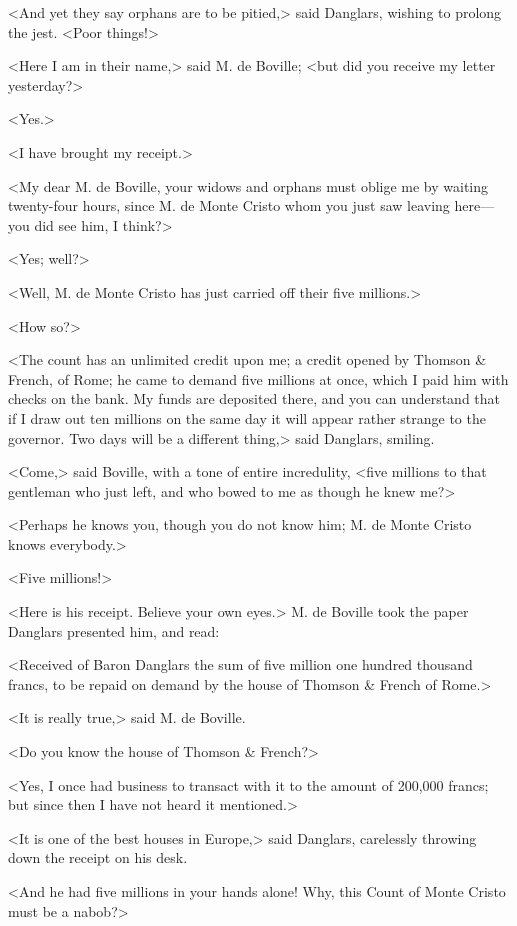  <And yet they say orphans are to be pitied,> said Danglars, wishing to prolong the jest. <Poor things!> 

 <Here I am in their name,> said M. de Boville; <but did you receive my letter yesterday?> 

 <Yes.> 

 <I have brought my receipt.>

<My dear M. de Boville, your widows and orphans must oblige me by waiting twenty-four hours, since M. de Monte Cristo whom you just saw leaving here—you did see him, I think?> 

 <Yes; well?> 

 <Well, M. de Monte Cristo has just carried off their five millions.> 

 <How so?> 

 <The count has an unlimited credit upon me; a credit opened by Thomson \& French, of Rome; he came to demand five millions at once, which I paid him with checks on the bank. My funds are deposited there, and you can understand that if I draw out ten millions on the same day it will appear rather strange to the governor. Two days will be a different thing,> said Danglars, smiling. 

 <Come,> said Boville, with a tone of entire incredulity, <five millions to that gentleman who just left, and who bowed to me as though he knew me?> 

 <Perhaps he knows you, though you do not know him; M. de Monte Cristo knows everybody.> 

 <Five millions!> 

 <Here is his receipt. Believe your own eyes.> M. de Boville took the paper Danglars presented him, and read: 

 <Received of Baron Danglars the sum of five million one hundred thousand francs, to be repaid on demand by the house of Thomson \& French of Rome.> 

 <It is really true,> said M. de Boville. 

 <Do you know the house of Thomson \& French?> 

 <Yes, I once had business to transact with it to the amount of 200,000 francs; but since then I have not heard it mentioned.> 

 <It is one of the best houses in Europe,> said Danglars, carelessly throwing down the receipt on his desk. 

 <And he had five millions in your hands alone! Why, this Count of Monte Cristo must be a nabob?> 

